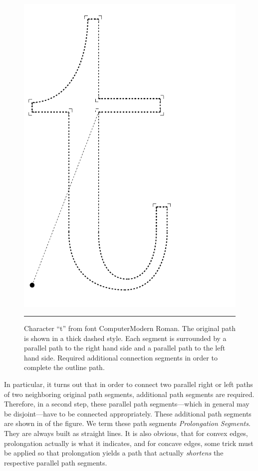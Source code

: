 \begin{figure}[t]
\includegraphics[scale=0.5]{t1dump/t1dump_t_2}
\hfill\break
\hrule\vskip3mm\small
\caption{\label{figure:stroking2} Character ``t'' from font
  ComputerModern Roman. The original path is shown in a thick dashed
  style. Each segment is surrounded by a parallel path to the right hand side
  and a parallel path to the left hand side. 
   Required additional connection segments in order to complete the
  outline path.}
\end{figure}

In particular, it turns out that in order to connect two parallel right or
left paths of two neighboring original path segments, additional path segments
are required. Therefore, in a second step, these parallel path
segments---which in general may be disjoint---have to be connected
appropriately. These additional path segments are shown in  of the
figure. We term these path segments {\em Prolongation Segments}. They
are always built as straight lines. It is also obvious, that for convex edges,
prolongation actually is what it indicates, and for concave edges, some trick
must be applied so that prolongation yields a path that actually {\em
  shortens} the respective parallel path segments.

